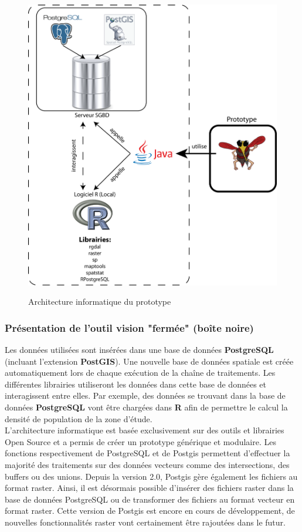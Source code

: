\begin{figure}[H]
\begin{center}
\includegraphics[width=12cm]{Architecture}\\
\caption{\label{Architecture} Architecture informatique du prototype}
\end{center}

\end{figure}


\subsubsection{Présentation de l'outil vision "fermée" (boîte noire)}

Les données utilisées sont insérées dans une base de données \textbf{PostgreSQL} (incluant l'extension \textbf{PostGIS}). Une nouvelle base de données spatiale est créée automatiquement lors de chaque exécution de la chaîne de traitements. Les différentes librairies utiliseront les données dans cette base de données et interagissent entre elles. Par exemple, des données se trouvant dans la base de données \textbf{PostgreSQL} vont être chargées dans \textbf{R} afin de permettre le calcul la densité de population de la zone d'étude.\\

L'architecture informatique est basée exclusivement sur des outils et librairies Open Source et a permis de créer un prototype générique et modulaire. Les fonctions respectivement de PostgreSQL  et de Postgis permettent d'effectuer la majorité des traitements sur des données vecteurs comme des intersections, des buffers ou des unions. Depuis la version 2.0, Postgis gère également les fichiers au format raster. Ainsi, il est désormais possible d'insérer des fichiers raster dans la base de données PostgreSQL ou de transformer des fichiers au format vecteur en format raster. Cette version de Postgis est encore en cours de développement, de nouvelles fonctionnalités raster vont certainement être rajoutées dans le futur. \\

